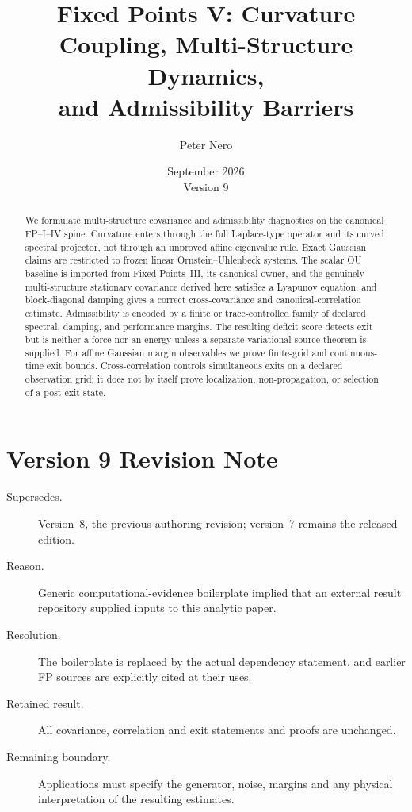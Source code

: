 \documentclass[11pt]{article}
\title{Fixed Points V: Curvature Coupling, Multi-Structure Dynamics,\\
and Admissibility Barriers}
\author{Peter Nero}
\date{September 2026\\Version 9}
\begin{document}
\maketitle
\seriestagline

\begin{abstract}
We formulate multi-structure covariance and admissibility diagnostics on the
canonical FP--I--IV spine. Curvature enters through the full Laplace-type
operator and its curved spectral projector, not through an unproved affine
eigenvalue rule. Exact Gaussian claims are restricted to frozen linear
Ornstein--Uhlenbeck systems. The scalar OU baseline is imported from
Fixed Points~III, its canonical owner, and the genuinely multi-structure
stationary covariance derived here satisfies a Lyapunov
equation, and block-diagonal damping gives a correct cross-covariance and
canonical-correlation estimate. Admissibility is encoded by a finite or
trace-controlled family of declared spectral, damping, and performance
margins. The resulting deficit score detects exit but is neither a force nor
an energy unless a separate variational source theorem is supplied. For
affine Gaussian margin observables we prove finite-grid and continuous-time
exit bounds. Cross-correlation controls simultaneous exits on a declared
observation grid; it does not by itself prove localization, non-propagation,
or selection of a post-exit state.
\end{abstract}

\section*{Version 9 Revision Note}
\begin{description}
\item[Supersedes.] Version~8, the previous authoring revision; version~7
remains the released edition.
\item[Reason.] Generic computational-evidence boilerplate implied that an
external result repository supplied inputs to this analytic paper.
\item[Resolution.] The boilerplate is replaced by the actual dependency
statement, and earlier FP sources are explicitly cited at their uses.
\item[Retained result.] All covariance, correlation and exit statements and
proofs are unchanged.
\item[Remaining boundary.] Applications must specify the generator, noise,
margins and any physical interpretation of the resulting estimates.
\end{description}
\end{document}
